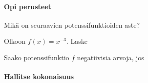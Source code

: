 \begin{tehtavasivu}

\paragraph*{Opi perusteet}

\begin{tehtava}
Mikä on seuraavien potenssifunktioiden aste?
\begin{alakohdat}
\end{alakohdat}
\begin{vastaus}
\begin{alakohdat}
\end{alakohdat}
\end{vastaus}
\end{tehtava}

\begin{tehtava}
Olkoon $f(x)=x^{-3}$. Laske
\begin{alakohdat}
\end{alakohdat}
\begin{vastaus}
\begin{alakohdat}
\end{alakohdat}
\end{vastaus}
\end{tehtava}

\begin{tehtava}
Saako potenssifunktio $f$ negatiivisia arvoja, jos
\begin{alakohdat}
\end{alakohdat}
\begin{vastaus}
\begin{alakohdat}
\end{alakohdat}
\end{vastaus}
\end{tehtava}

\paragraph*{Hallitse kokonaisuus}


\end{tehtavasivu}
